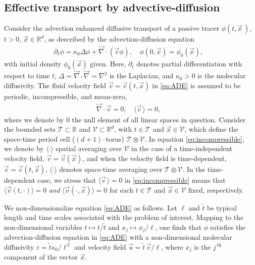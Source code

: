 \documentclass[11pt]{amsart}
\newcommand{\Tc}{\mathcal{T}}
\newcommand{\Vc}{\mathcal{V}}
\begin{document}
\subsection{Effective transport by
  advective-diffusion} \label{sec:Eff_Trans}  
%
Consider the advection enhanced diffusive transport of a passive
tracer $\phi(t,\vec{x}\,)$, $t>0$, $\vec{x}\in\mathbb{R}^d$, as described by
the advection-diffusion equation 
%
\begin{align}\label{eq:ADE}
  \partial_t\phi=\kappa_0\Delta \phi+\vec{\nabla}\cdot(\vec{v}\phi), \quad
  \phi(0,\vec{x})=\phi_0(\vec{x}),
\end{align}
% 
with initial density $\phi_0(\vec{x})$ given. Here, $\partial_t$ denotes partial
differentiation with respect to time $t$, $\Delta=\vec{\nabla}\cdot\vec{\nabla}=\nabla^2$ is
the Laplacian, and $\kappa_0>0$ is the molecular diffusivity. The fluid
velocity field $\vec{v}=\vec{v}(t,\vec{x})$ in \eqref{eq:ADE} is
assumed to be periodic, incompressible, and mean-zero, %
%
\begin{align}\label{eq:incompressible}
  \vec{\nabla}\cdot\vec{v}=0, \quad
  \langle\vec{v}\,\rangle=0,
\end{align}
%
where we denote by $0$ the null element of all linear spaces in
question. Consider the bounded sets $\Tc\subset\mathbb{R}$ and
$\Vc\subset\mathbb{R}^d$, with $t\in\Tc$ and $\vec{x}\in\Vc$, which define the  
space-time period cell ($(d+1)$--torus) $\Tc\otimes\Vc$. In equation
\eqref{eq:incompressible}, we denote by $\langle\cdot\rangle$ spatial averaging over
$\Vc$ in the case of a time-independent velocity field,
$\vec{v}=\vec{v}(\vec{x})$, and when the velocity field is
time-dependent, $\vec{v}=\vec{v}(t,\vec{x})$, $\langle\cdot\rangle$ denotes space-time
averaging over $\Tc\otimes\Vc$. In the time-dependent case, we stress that
$\langle\vec{v}\,\rangle=0$ in \eqref{eq:incompressible} means that
$\langle\vec{v}(t,\cdot)\rangle=0$ \emph{and} $\langle\vec{v}(\cdot,\vec{x})\rangle=0$ for each
$t\in\Tc$ and $\vec{x}\in\Vc$ fixed, respectively. 



We non-dimensionalize equation
\eqref{eq:ADE} as follows. Let $\ell$ and $\tilde{t}$ be typical length
and time scales associated with the problem of interest. Mapping to
the non-dimensional variables $t\mapsto t/\tilde{t}$ and $x_j\mapsto x_j/\ell$, one
finds that $\phi$ satisfies the advection-diffusion equation in
\eqref{eq:ADE} with a non-dimensional molecular diffusivity
$\varepsilon=\tilde{t}\kappa_0/\ell^{\,2}$ and velocity field
$\vec{u}=\tilde{t}\,\vec{v}/\ell$, where $x_j$ is the $j^{\,\text{th}}$
component of the vector $\vec{x}$. 
\end{document}
